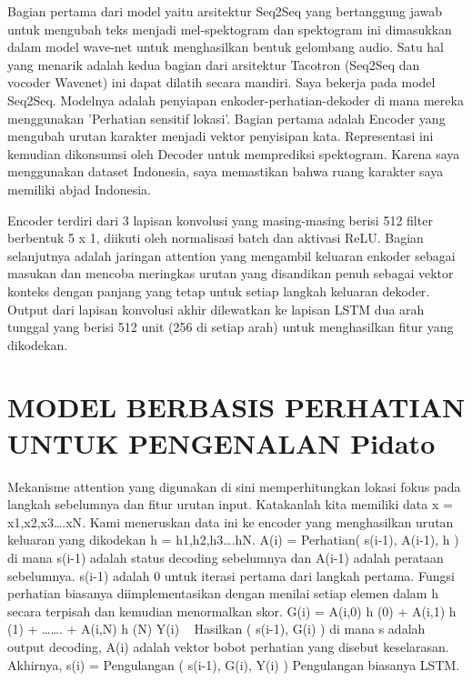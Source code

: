 Bagian pertama dari model yaitu arsitektur Seq2Seq yang bertanggung jawab untuk mengubah teks menjadi mel-spektogram dan spektogram ini dimasukkan dalam model wave-net untuk menghasilkan bentuk gelombang audio. Satu hal yang menarik adalah kedua bagian dari arsitektur Tacotron (Seq2Seq dan vocoder Wavenet) ini dapat dilatih secara mandiri. Saya bekerja pada model Seq2Seq.
Modelnya adalah penyiapan enkoder-perhatian-dekoder di mana mereka menggunakan 'Perhatian sensitif lokasi'. Bagian pertama adalah Encoder yang mengubah urutan karakter menjadi vektor penyisipan kata. Representasi ini kemudian dikonsumsi oleh Decoder untuk memprediksi spektogram. Karena saya menggunakan dataset Indonesia, saya memastikan bahwa ruang karakter saya memiliki abjad Indonesia.

Encoder terdiri dari 3 lapisan konvolusi yang masing-masing berisi 512 filter berbentuk 5 x 1, diikuti oleh normalisasi batch dan aktivasi ReLU. Bagian selanjutnya adalah jaringan attention yang mengambil keluaran enkoder sebagai masukan dan mencoba meringkas urutan yang disandikan penuh sebagai vektor konteks dengan panjang yang tetap untuk setiap langkah keluaran dekoder.
Output dari lapisan konvolusi akhir dilewatkan ke lapisan LSTM dua arah tunggal yang berisi 512 unit (256 di setiap arah) untuk menghasilkan fitur yang dikodekan.

\section{MODEL BERBASIS PERHATIAN UNTUK PENGENALAN Pidato}
Mekanisme attention yang digunakan di sini memperhitungkan lokasi fokus pada langkah sebelumnya dan fitur urutan input.
Katakanlah kita memiliki data x = {x1,x2,x3….xN}. Kami meneruskan data ini ke encoder yang menghasilkan urutan keluaran yang dikodekan h = {h1,h2,h3….hN}.
A(i) = Perhatian( s(i-1), A(i-1), h ) di mana s(i-1) adalah status decoding sebelumnya dan A(i-1) adalah perataan sebelumnya.
s(i-1) adalah 0 untuk iterasi pertama dari langkah pertama.
Fungsi perhatian biasanya diimplementasikan dengan menilai setiap elemen dalam h secara terpisah dan kemudian menormalkan skor.
G(i) = A(i,0) h (0) + A(i,1) h (1) + ……. + A(i,N) h (N)
Y(i) ~ Hasilkan ( s(i-1), G(i) )
di mana s adalah output decoding, A(i) adalah vektor bobot perhatian yang disebut keselarasan.
Akhirnya, s(i) = Pengulangan ( s(i-1), G(i), Y(i) )
Pengulangan biasanya LSTM.


